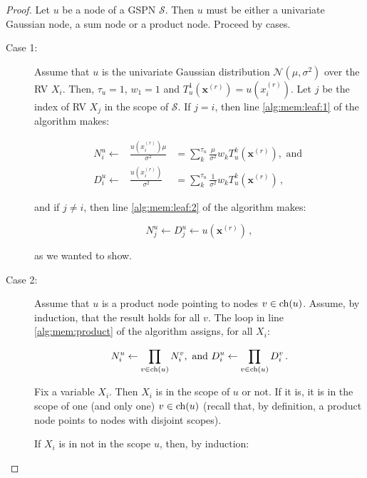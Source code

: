 \begin{proof}
  Let $u$ be a node of a GSPN $\mathcal{S}$. Then $u$ must be either a univariate Gaussian node, a sum node or a product node. Proceed by cases.

  \begin{description}
    \item[Case 1:]
      Assume that $u$ is the univariate Gaussian distribution $\mathcal{N}(\mu, \sigma^2)$ over the RV $X_i$. Then, $\tau_u = 1$, $w_1 = 1$ and $T_u^1\left(\mathbf{x}^{(r)}\right) = u\left(x^{(r)}_i\right)$. Let $j$ be the index of RV $X_j$ in the scope of $\mathcal{S}$. If $j = i$, then line \ref{alg:mem:leaf:1} of the algorithm makes:

      \begin{eqnarray}
        N^u_i \gets & \frac{u\left(x^{(r)}_i\right)\mu}{\sigma^2} & = \sum_{k}^{\tau_u} \frac{\mu}{\sigma^2} w_k T_u^k\left(\mathbf{x}^{(r)}\right), \text{ and } \\
        D^u_i \gets & \frac{u\left(x^{(r)}_i\right)}{\sigma^2} & = \sum_{k}^{\tau_u} \frac{1}{\sigma^2} w_k T_u^k\left(\mathbf{x}^{(r)}\right) \, ,
      \end{eqnarray}

      \noindent and if $j \neq i$, then line \ref{alg:mem:leaf:2} of the algorithm makes:

      \begin{equation}
        N^u_j \gets D^u_j \gets u\left(\mathbf{x}^{(r)}\right) \, ,
      \end{equation}

      \noindent as we wanted to show.

    \item[Case 2:] Assume that $u$ is a product node pointing to nodes $v \in \operatorname*{ch}(u)$. Assume, by induction, that the result holds for all $v$. The loop in line \ref{alg:mem:product} of the algorithm assigns, for all $X_i$:

      \begin{equation}
        N^u_i \gets \prod_{v \in \operatorname*{ch}(u)} N^v_i, \text{ and }
        D^u_i \gets \prod_{v \in \operatorname*{ch}(u)} D^v_i \, .
      \end{equation}

      Fix a variable $X_i$. Then $X_i$ is in the scope of $u$ or not. If it is, it is in the scope of one (and only one) $v \in \operatorname*{ch}(u)$ (recall that, by definition, a product node points to nodes with disjoint scopes).

      If $X_i$ is in not in the scope $u$, then, by induction:


\end{description}
\end{proof}
